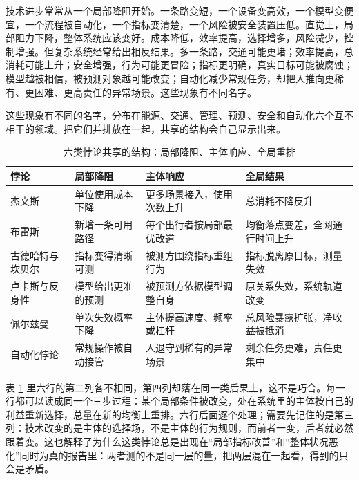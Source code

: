 技术进步常常从一个局部降阻开始。一条路变短，一个设备变高效，一个模型变便宜，一个流程被自动化，一个指标变清楚，一个风险被安全装置压低。直觉上，局部阻力下降，整体系统应该变好。成本降低，效率提高，选择增多，风险减少，控制增强。但复杂系统经常给出相反结果。多一条路，交通可能更堵；效率提高，总消耗可能上升；安全增强，行为可能更冒险；指标更明确，真实目标可能被腐蚀；模型越被相信，被预测对象越可能改变；自动化减少常规任务，却把人推向更稀有、更困难、更高责任的异常场景。这些现象有不同名字。


这些现象有不同的名字，分布在能源、交通、管理、预测、安全和自动化六个互不相干的领域。把它们并排放在一起，共享的结构会自己显示出来。

\begin{table}[ht]
\centering
\caption{六类悖论共享的结构：局部降阻、主体响应、全局重排}
\label{tab:ch1-paradox}
{\small
\begin{tabularx}{\textwidth}{@{}l >{\RaggedRight\arraybackslash}p{2.7cm} >{\RaggedRight\arraybackslash}p{3.4cm} >{\RaggedRight\arraybackslash}X@{}}
\toprule
悖论 & 局部降阻 & 主体响应 & 全局结果 \\
\midrule
杰文斯 & 单位使用成本下降 & 更多场景接入，使用次数上升 & 总消耗不降反升 \\
布雷斯 & 新增一条可用路径 & 每个出行者按局部最优改道 & 均衡落点变差，全网通行时间上升 \\
古德哈特与坎贝尔 & 指标变得清晰可测 & 被测方围绕指标重组行为 & 指标脱离原目标，测量失效 \\
卢卡斯与反身性 & 模型给出更准的预测 & 被预测方依据模型调整自身 & 原关系失效，系统轨道改变 \\
佩尔兹曼 & 单次失效概率下降 & 主体提高速度、频率或杠杆 & 总风险暴露扩张，净收益被抵消 \\
自动化悖论 & 常规操作被自动接管 & 人退守到稀有的异常场景 & 剩余任务更难，责任更集中 \\
\bottomrule
\end{tabularx}}
\end{table}

表 \ref{tab:ch1-paradox} 里六行的第二列各不相同，第四列却落在同一类后果上，这不是巧合。每一行都可以读成同一个三步过程：某个局部条件被改变，处在系统里的主体按自己的利益重新选择，总量在新的均衡上重排。六行后面逐个处理；需要先记住的是第三列：技术改变的是主体的选择场，不是主体的行为规则，而前者一变，后者就必然跟着变。这也解释了为什么这类悖论总是出现在“局部指标改善”和“整体状况恶化”同时为真的报告里：两者测的不是同一层的量，把两层混在一起看，得到的只会是矛盾。

